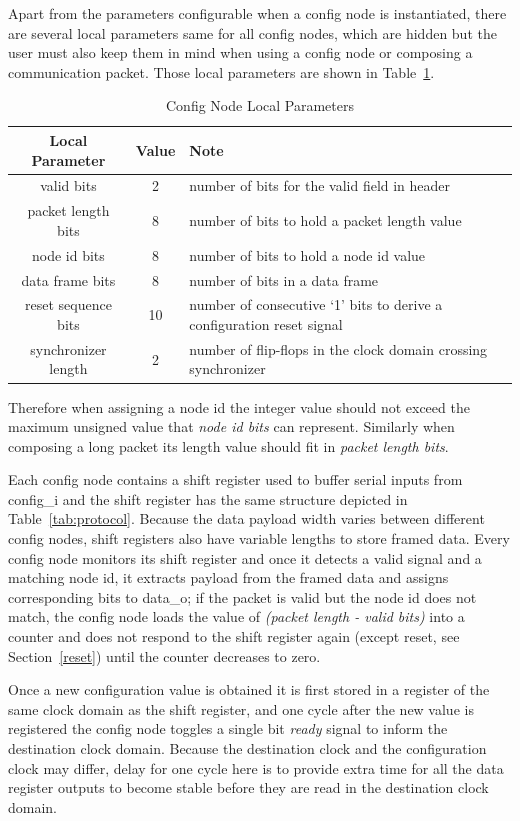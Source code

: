 \documentclass[12pt]{article}
\newcommand{\reftab}[1]{Table~\ref{#1}}
\newcommand{\refsec}[1]{Section~\ref{#1}}
\begin{document}
Apart from the parameters configurable when a config node is instantiated,
there are several local parameters same for all config nodes, which are hidden
but the user must also keep them in mind when using a config node or composing
a communication packet. Those local parameters are shown in
\reftab{tab:localparams}.
\begin{table}[h]
\centering
  \begin{tabular}{ | c | c | p{8cm} | }
  \hline
    Local Parameter & Value & Note \\ \hline
    valid bits & 2 & number of bits for the valid field in header \\ \hline
    packet length bits & 8 & number of bits to hold a packet length value \\ \hline
    node id bits & 8 & number of bits to hold a node id value \\ \hline
    data frame bits & 8 & number of bits in a data frame \\ \hline
    reset sequence bits & 10 & number of consecutive `1' bits to derive a configuration reset signal \\ \hline
    synchronizer length & 2 & number of flip-flops in the clock domain crossing synchronizer \\ \hline
  \end{tabular}
\caption{Config Node Local Parameters}
\label{tab:localparams}
\end{table}
Therefore when assigning a node id the integer value should not exceed the
maximum unsigned value that \textit{node id bits} can represent. Similarly
when composing a long packet its length value should fit in \textit{packet
length bits}.

Each config node contains a shift register used to buffer serial inputs from
config\_i and the shift register has the same structure depicted in
\reftab{tab:protocol}. Because the data payload width varies between different
config nodes, shift registers also have variable lengths to store framed
data. Every config node monitors its shift register and once it detects a valid
signal and a matching node id, it extracts payload from the framed data and
assigns corresponding bits to data\_o; if the packet is valid but the node id
does not match, the config node loads the value of
\textit{(packet length - valid bits)} into a counter and does not respond to
the shift register again (except reset, see \refsec{reset}) until the counter
decreases to zero.

Once a new configuration value is obtained it is first stored in a register of
the same clock domain as the shift register, and one cycle after the new value
is registered the config node toggles a single bit \textit{ready} signal to
inform the destination clock domain. Because the destination clock and the
configuration clock may differ, delay for one cycle here is to provide extra
time for all the data register outputs to become stable before they are read in
the destination clock domain.
\end{document}
